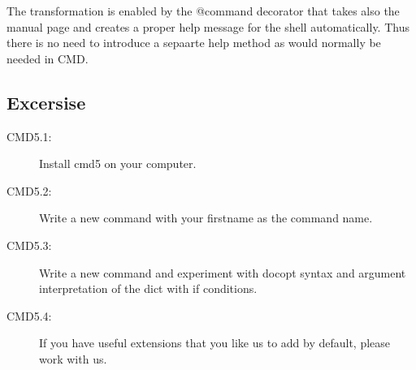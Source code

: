 The transformation is enabled by the @command decorator that takes also
the manual page and creates a proper help message for the shell
automatically. Thus there is no need to introduce a sepaarte help method
as would normally be needed in CMD.

\subsection{Excersise}\label{excersise}

\begin{description}
\item[CMD5.1:]
Install cmd5 on your computer.
\item[CMD5.2:]
Write a new command with your firstname as the command name.
\item[CMD5.3:]
Write a new command and experiment with docopt syntax and argument
interpretation of the dict with if conditions.
\item[CMD5.4:]
If you have useful extensions that you like us to add by default, please
work with us.
\end{description}
